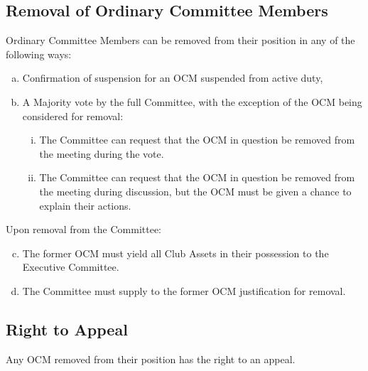 \documentclass[a4paper,12pt]{article}
\begin{document}
\subsection{Removal of Ordinary Committee Members}

Ordinary Committee Members can be removed from their position in any of the following ways:

\begin{enumerate}[a)]
	\item Confirmation of suspension for an OCM suspended from active duty,
	\item A Majority vote by the full Committee, with the exception of the OCM being considered for removal:
	\begin{enumerate}[i)]
		\item The Committee can request that the OCM in question be removed from the meeting during the vote.
		\item The Committee can request that the OCM in question be removed from the meeting during discussion, but the OCM must be given a chance to explain their actions.
	\end{enumerate}
\end{enumerate}

Upon removal from the Committee:

\begin{enumerate}[a)]
	\setcounter{enumi}{2}
	\item The former OCM must yield all Club Assets in their possession to the Executive Committee.
	\item The Committee must supply to the former OCM justification for removal.
\end{enumerate}

\subsection{Right to Appeal}

Any OCM removed from their position has the right to an appeal.
\end{document}
